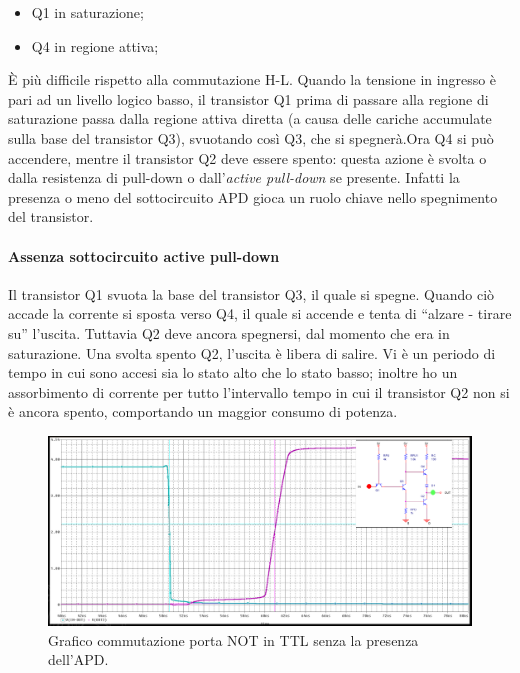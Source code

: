 \documentclass[
]{book}
\providecommand{\tightlist}{%
  \setlength{\itemsep}{0pt}\setlength{\parskip}{0pt}}
\begin{document}
\begin{itemize}
\begin{itemize}
    \begin{itemize}
    \tightlist
    \item
      Q1 in saturazione;
    \item
      Q4 in regione attiva;
    \end{itemize}
  \end{itemize}

  È più difficile rispetto alla commutazione H-L. Quando la tensione in
  ingresso è pari ad un livello logico basso, il transistor Q1 prima di
  passare alla regione di saturazione passa dalla regione attiva diretta
  (a causa delle cariche accumulate sulla base del transistor Q3),
  svuotando così Q3, che si spegnerà.\newline Ora Q4 si può accendere,
  mentre il transistor Q2 deve essere spento: questa azione è svolta o
  dalla resistenza di pull-down o dall'\emph{active pull-down} se
  presente. Infatti la presenza o meno del sottocircuito APD gioca un
  ruolo chiave nello spegnimento del transistor.
\end{itemize}

\paragraph{Assenza sottocircuito active
pull-down}\label{assenza-sottocircuito-active-pull-down}

Il transistor Q1 svuota la base del transistor Q3, il quale si spegne.
Quando ciò accade la corrente si sposta verso Q4, il quale si accende e
tenta di ``alzare - tirare su'' l'uscita. Tuttavia Q2 deve ancora
spegnersi, dal momento che era in saturazione. Una svolta spento Q2,
l'uscita è libera di salire. \newline Vi è un periodo di tempo in cui
sono accesi sia lo stato alto che lo stato basso; inoltre ho un
assorbimento di corrente per tutto l'intervallo tempo in cui il
transistor Q2 non si è ancora spento, comportando un maggior consumo di
potenza.

\begin{figure}
\centering
\includegraphics[width=0.5\linewidth,height=\textheight,keepaspectratio]{assets/imgs/commutazione_l_h_no_apd.png}
\caption{Grafico commutazione porta NOT in TTL senza la presenza
dell'APD.}
\end{figure}
\end{document}
